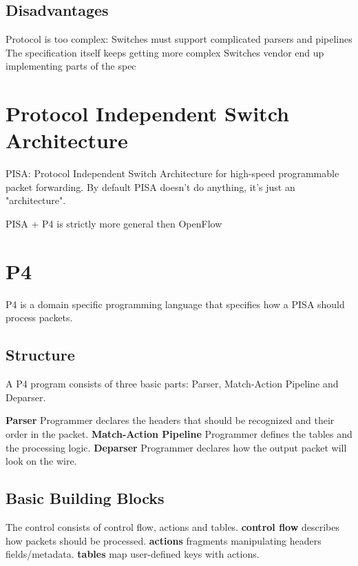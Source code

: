 \documentclass[a4paper, fontsize=8pt, landscape, DIV=1]{scrartcl}
\begin{document}
\begin{multicols*}{4}
  \subsection{Disadvantages}
  \begin{outline}
    \1 Protocol is too complex:
    Switches must support complicated parsers and pipelines
    \1 The specification itself keeps getting more complex
    \1 Switches vendor end up implementing parts of the spec
  \end{outline}

  \section{Protocol Independent Switch Architecture}
  PISA: Protocol Independent Switch Architecture for high-speed programmable
  packet forwarding. By default PISA doesn't do anything, it's just an "architecture".

  PISA + P4 is strictly more general then OpenFlow

  \section{P4}
  P4 is a domain specific programming language that specifies how a PISA should
  process packets.
  \subsection{Structure}
  A P4 program consists of three basic parts: Parser, Match-Action Pipeline and
  Deparser. 

  \textbf{Parser} Programmer declares the headers that should be recognized and
  their order in the packet. 
  \textbf{Match-Action Pipeline} Programmer defines the tables and the processing
  logic.
  \textbf{Deparser} Programmer declares how the output packet will look on the wire.

  \subsection{Basic Building Blocks}
  The control consists of control flow, actions and tables.
  \textbf{control flow} describes how packets should be processed.
  \textbf{actions} fragments manipulating headers fields/metadata.
  \textbf{tables} map user-defined keys with actions.


\end{multicols*}
\end{document}
